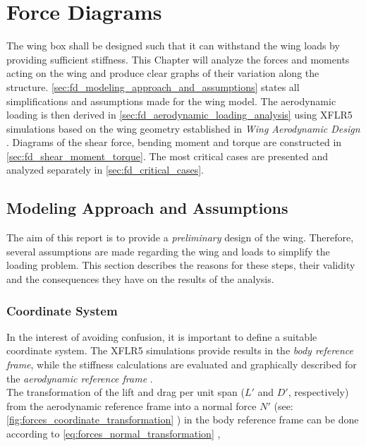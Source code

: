 \chapter{Force Diagrams}
\label{ch:ForceDiagram}
The wing box shall be designed such that it can withstand the wing loads by providing sufficient stiffness. This Chapter will analyze the forces and moments acting on the wing and produce clear graphs of their variation along the structure. \autoref{sec:fd_modeling_approach_and_assumptions} states all simplifications and assumptions made for the wing model. The aerodynamic loading is then derived in \autoref{sec:fd_aerodynamic_loading_analysis} using XFLR5 simulations based on the wing geometry established in \textit{Wing Aerodynamic Design} \cite{Koppejan2024WingDesign}. Diagrams of the shear force, bending moment and torque are constructed in \autoref{sec:fd_shear_moment_torque}. The most critical cases are presented and analyzed separately in \autoref{sec:fd_critical_cases}.

\section{Modeling Approach and Assumptions} \label{sec:fd_modeling_approach_and_assumptions}

The aim of this report is to provide a \textit{preliminary} design of the wing. Therefore, several assumptions are made regarding the wing and loads to simplify the loading problem. This section describes the reasons for these steps, their validity and the consequences they have on the results of the analysis.

\subsection*{Coordinate System}
In the interest of avoiding confusion, it is important to define a suitable coordinate system. The XFLR5 simulations provide results in the \textit{body reference frame}, while the stiffness calculations are evaluated and graphically described for the \textit{aerodynamic reference frame} \cite{Timmer2024ProjectDesign}.\\

\noindent The transformation of the lift and drag per unit span ($L'$ and $D'$, respectively) from the aerodynamic reference frame into a normal force $N'$ (see: \autoref{fig:forces_coordinate_transformation} \cite{Timmer2024ProjectDesign}) in the body reference frame can be done according to \autoref{eq:forces_normal_transformation} \cite{Timmer2024ProjectDesign}, \\


